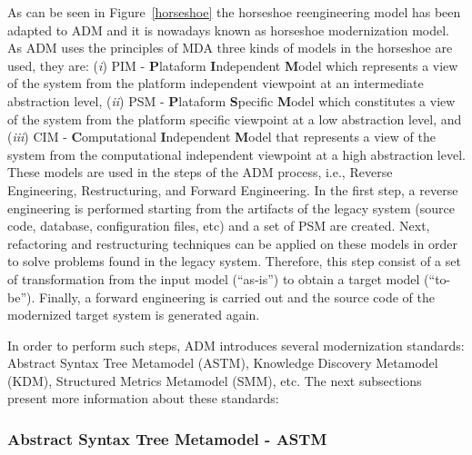 As can be seen in Figure~\ref{horseshoe} the horseshoe reengineering model has been adapted to ADM and it is nowadays known as horseshoe modernization model. As ADM uses the principles of MDA three kinds of models in the horseshoe are used, they are: (\textit{i}) PIM - \textbf{P}lataform \textbf{I}ndependent \textbf{M}odel which represents a view of the system from the platform independent viewpoint at an intermediate abstraction level, (\textit{ii}) PSM - \textbf{P}lataform \textbf{S}pecific \textbf{M}odel which constitutes a view of the system from the platform specific viewpoint at a low abstraction level, and (\textit{iii}) CIM - \textbf{C}omputational \textbf{I}ndependent \textbf{M}odel that represents a view of the system from the computational independent viewpoint at a high abstraction level. These models are used in the steps of the ADM process, i.e., Reverse Engineering, Restructuring, and Forward Engineering. In the first step, a reverse engineering is performed starting from the artifacts of the legacy system (source code, database, configuration files, etc) and a set of PSM are created. Next, refactoring and restructuring techniques can be applied on these models in order to solve problems found in the legacy system. Therefore, this step consist of a set of transformation from the input model (``as-is'') to obtain a target model (``to-be''). Finally, a forward engineering is carried out and the source code of the modernized target system is generated again. 


In order to perform such steps, ADM introduces several modernization standards: Abstract Syntax Tree Metamodel (ASTM), Knowledge Discovery Metamodel (KDM), Structured Metrics Metamodel (SMM), etc. The next subsections present more information about these standards:



\subsubsection{Abstract Syntax Tree Metamodel - ASTM}

